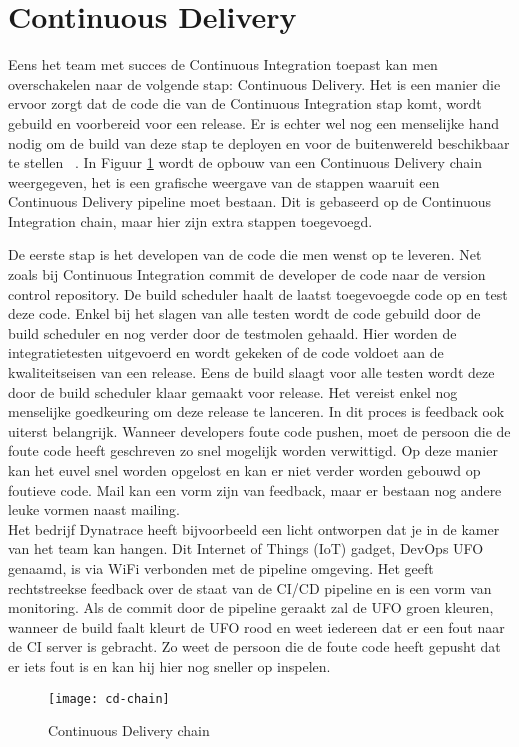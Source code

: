         \section{Continuous Delivery}
        Eens het team met succes de Continuous Integration toepast kan men overschakelen naar de volgende stap: Continuous Delivery.
        Het is een manier die ervoor zorgt dat de code die van de Continuous Integration stap komt, wordt gebuild en voorbereid voor een release.
        Er is echter wel nog een menselijke hand nodig om de build van deze stap te deployen en voor de buitenwereld beschikbaar te stellen ~\autocite{Fowler2013}.
        \newline{}In Figuur \ref{img-cd-chain} wordt de opbouw van een Continuous Delivery chain weergegeven, het is een grafische weergave van de stappen waaruit een Continuous Delivery pipeline moet bestaan. Dit is gebaseerd op de Continuous Integration chain, maar hier zijn extra stappen toegevoegd.
        
        De eerste stap is het developen van de code die men wenst op te leveren. Net zoals bij Continuous Integration commit de developer de code naar de version control repository. De build scheduler haalt de laatst toegevoegde code op en test deze code. Enkel bij het slagen van alle testen wordt de code gebuild door de build scheduler en nog verder door de testmolen gehaald. Hier worden de integratietesten uitgevoerd en wordt gekeken of de code voldoet aan de kwaliteitseisen van een release. Eens de build slaagt voor alle testen wordt deze door de build scheduler klaar gemaakt voor release. Het vereist enkel nog menselijke goedkeuring om deze release te lanceren.
        \newline{}In dit proces is feedback ook uiterst belangrijk. Wanneer developers foute code pushen, moet de persoon die de foute code heeft geschreven zo snel mogelijk worden verwittigd. Op deze manier kan het euvel snel worden opgelost en kan er niet verder worden gebouwd op foutieve code.
        Mail kan een vorm zijn van feedback, maar er bestaan nog andere leuke vormen naast mailing.\\
        Het bedrijf Dynatrace heeft bijvoorbeeld een licht ontworpen dat je in de kamer van het team kan hangen. Dit Internet of Things (IoT) gadget, DevOps UFO genaamd, is via WiFi verbonden met de pipeline omgeving. Het geeft rechtstreekse feedback over de staat van de CI/CD pipeline en is een vorm van monitoring. Als de commit door de pipeline geraakt zal de UFO groen kleuren, wanneer de build faalt kleurt de UFO rood en weet iedereen dat er een fout naar de CI server is gebracht. Zo weet de persoon die de foute code heeft gepusht dat er iets fout is en kan hij hier nog sneller op inspelen. 
        \begin{figure}	
            \texttt{[image: cd-chain]}
            \caption{Continuous Delivery chain ~\autocite{Riti2018}} \label{img-cd-chain}
        \end{figure}
        
